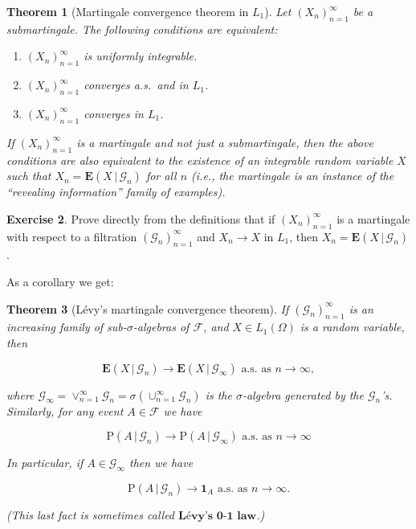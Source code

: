 \documentclass[11pt]{report}
\theoremstyle{plain}
\newtheorem{thm}{Theorem}[chapter]
\theoremstyle{definition}
\newtheorem{xexercise}[thm]{Exercise}
\begin{document}
\begin{thm}[Martingale convergence theorem in $L_1$]
Let $(X_n)_{n=1}^\infty$ be a submartingale. The
following conditions are equivalent:

\begin{enumerate}[label=\arabic*.]
\item $(X_n)_{n=1}^\infty$ is uniformly integrable.

\item $(X_n)_{n=1}^\infty$ converges a.s.\ and in $L_1$.

\item $(X_n)_{n=1}^\infty$ converges in $L_1$.
\end{enumerate}

\noindent If $(X_n)_{n=1}^\infty$ is a martingale and not just
a submartingale, then the above conditions are also
equivalent to the existence of an integrable random
variable $X$ such that
$X_n = \mathbf{E}\left(X\,|\,\mathcal{G}_n\right)$
for all $n$ (i.e., the martingale is an instance of
the ``revealing information'' family of examples).
\end{thm}

\begin{xexercise}
Prove directly from the definitions that if
$(X_n)_{n=1}^\infty$ is a martingale with respect to
a filtration $(\mathcal{G}_n)_{n=1}^\infty$ and
$X_n\to X$ in $L_1$, then
$X_n = \mathbf{E}\left(X\,|\,\mathcal{G}_n\right)$.
\end{xexercise}

\noindent As a corollary we get:

\begin{thm}[Lévy's martingale convergence theorem]
\label{eq:levy-martingale-conv}
If $(\mathcal{G}_n)_{n=1}^\infty$ is an increasing
family of sub-$\sigma$-algebras of $\mathcal{F}$, and
$X\in L_1(\Omega)$ is a random variable, then

\[
\mathbf{E}\left(X\,|\,\mathcal{G}_n\right) \to \mathbf{E}\left(X\,|\,\mathcal{G}_\infty\right) \textrm{ a.s. as }n\to\infty,
\]

\noindent where
$\mathcal{G}_\infty = \vee_{n=1}^\infty \mathcal{G}_n
= \sigma\left(\cup_{n=1}^\infty \mathcal{G}_n\right)$
is the $\sigma$-algebra generated by the
$\mathcal{G}_n$'s. Similarly, for any event
$A\in \mathcal{F}$ we have

\[
\mathrm{P}\left(A\,|\,\mathcal{G}_n\right) \to \mathrm{P}\left(A\,|\,\mathcal{G}_\infty\right) \textrm{ a.s. as }n\to\infty
\]

\noindent In particular, if $A \in \mathcal{G}_\infty$ then we
have

\begin{equation*} \tag{8}\label{eq:levy-zero-one}
\mathrm{P}\left(A\,|\,\mathcal{G}_n\right) \to \mathbf{1}_A \textrm{ a.s. as }n\to\infty.
\end{equation*}

\noindent (This last fact is sometimes called
$\textbf{Lévy's 0-1 law}$.)
\end{thm}
\end{document}

